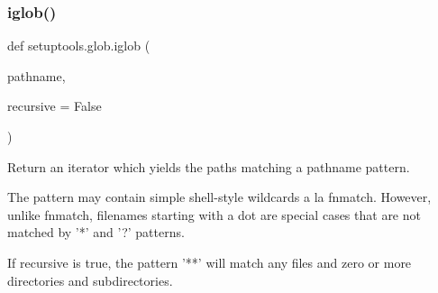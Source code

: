 \subsubsection{\texorpdfstring{iglob()}{iglob()}}
{\footnotesize\ttfamily def setuptools.\+glob.\+iglob (\begin{DoxyParamCaption}\item[{}]{pathname,  }\item[{}]{recursive = {\ttfamily False} }\end{DoxyParamCaption})}

\begin{DoxyVerb}Return an iterator which yields the paths matching a pathname pattern.

The pattern may contain simple shell-style wildcards a la
fnmatch. However, unlike fnmatch, filenames starting with a
dot are special cases that are not matched by '*' and '?'
patterns.

If recursive is true, the pattern '**' will match any files and
zero or more directories and subdirectories.
\end{DoxyVerb}
 